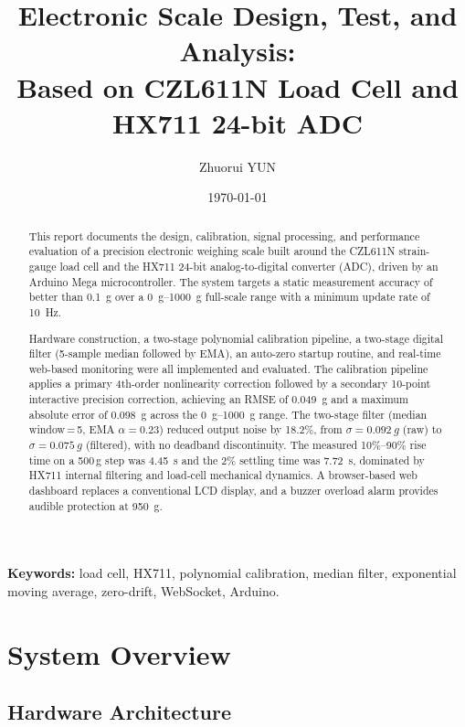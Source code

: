 \documentclass[12pt,a4paper]{article}
\title{\LARGE \bf Electronic Scale Design, Test, and Analysis:\\
Based on CZL611N Load Cell and HX711 24-bit ADC}
\author{\large Zhuorui YUN}
\affil{\small Department of Mechanical Engineering and Robotic}
\affil{\small Guangdong Technion -- Israel Institute of Technology}
\affil{\small \normalfont \texttt{yun24239@gtiit.edu.cn}}
\date{\today}
\begin{document}
\maketitle
\thispagestyle{empty}

\begin{abstract}
\noindent
This report documents the design, calibration, signal processing, and performance
evaluation of a precision electronic weighing scale built around the CZL611N
strain-gauge load cell and the HX711 24-bit analog-to-digital converter (ADC),
driven by an Arduino Mega microcontroller. The system targets a static measurement
accuracy of better than \SI{0.1}{g} over a \SI{0}{g}--\SI{1000}{g} full-scale range
with a minimum update rate of \SI{10}{Hz}.

Hardware construction, a two-stage polynomial calibration pipeline, a two-stage
digital filter (5-sample median followed by EMA), an auto-zero startup routine, and
real-time web-based monitoring were all implemented and evaluated. The calibration
pipeline applies a primary 4th-order nonlinearity correction followed by a secondary
10-point interactive precision correction, achieving an RMSE of \SI{0.049}{g} and a
maximum absolute error of \SI{0.098}{g} across the \SIrange{0}{1000}{g} range. The
two-stage filter (median window\,=\,5, EMA $\alpha = 0.23$) reduced output noise by
18.2\%, from $\sigma = \SI{0.092}{g}$ (raw) to $\sigma = \SI{0.075}{g}$ (filtered),
with no deadband discontinuity. The measured 10\%--90\% rise time on a 500\,g step
was \SI{4.45}{s} and the 2\% settling time was \SI{7.72}{s}, dominated by HX711
internal filtering and load-cell mechanical dynamics. A browser-based web dashboard
replaces a conventional LCD display, and a buzzer overload alarm provides audible
protection at \SI{950}{g}.
\end{abstract}

\noindent\textbf{Keywords:} load cell, HX711, polynomial calibration, median filter,
exponential moving average, zero-drift, WebSocket, Arduino.

\newpage
\tableofcontents
\newpage

\section{System Overview}

\subsection{Hardware Architecture}
\end{document}
